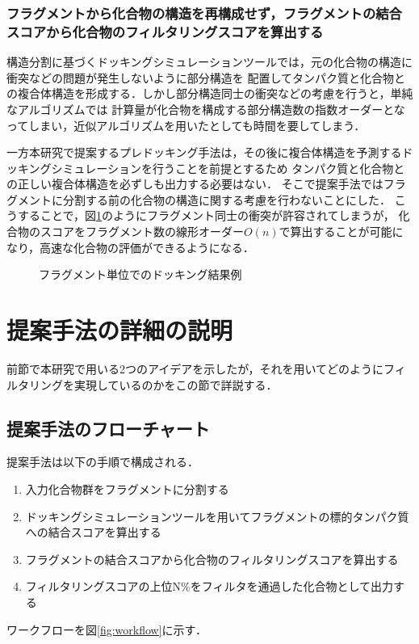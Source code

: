 \subsubsection{フラグメントから化合物の構造を再構成せず，フラグメントの結合スコアから化合物のフィルタリングスコアを算出する}
構造分割に基づくドッキングシミュレーションツールでは，元の化合物の構造に衝突などの問題が発生しないように部分構造を
配置してタンパク質と化合物との複合体構造を形成する．しかし部分構造同士の衝突などの考慮を行うと，単純なアルゴリズムでは
計算量が化合物を構成する部分構造数の指数オーダーとなってしまい，近似アルゴリズムを用いたとしても時間を要してしまう．

一方本研究で提案するプレドッキング手法は，その後に複合体構造を予測するドッキングシミュレーションを行うことを前提とするため
タンパク質と化合物との正しい複合体構造を必ずしも出力する必要はない．
そこで提案手法ではフラグメントに分割する前の化合物の構造に関する考慮を行わないことにした．
こうすることで，図\ref{fig:divided_fragment}のようにフラグメント同士の衝突が許容されてしまうが，
化合物のスコアをフラグメント数の線形オーダー$O(n)$で算出することが可能になり，高速な化合物の評価ができるようになる．

\begin{figure}[t]
 \begin{center}
  \caption{フラグメント単位でのドッキング結果例}
  \label{fig:divided_fragment}
 \end{center}
\end{figure}



\section{提案手法の詳細の説明}
前節で本研究で用いる2つのアイデアを示したが，それを用いてどのようにフィルタリングを実現しているのかをこの節で詳説する．

\subsection{提案手法のフローチャート}\label{subsec:flowchart}
提案手法は以下の手順で構成される．
\begin{enumerate}
\item 入力化合物群をフラグメントに分割する
\item ドッキングシミュレーションツールを用いてフラグメントの標的タンパク質への結合スコアを算出する
\item フラグメントの結合スコアから化合物のフィルタリングスコアを算出する
\item フィルタリングスコアの上位N\%をフィルタを通過した化合物として出力する
\end{enumerate}
ワークフローを図\ref{fig:workflow}に示す．

